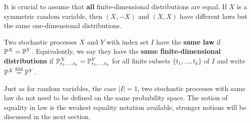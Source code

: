 It is crucial to assume that \textbf{all} finite-dimensional distributions are equal. If $X$ is a symmetric random variable, then $(X,-X)$ and $(X,X)$ have different laws but the same one-dimensional distributions.
\begin{ldef}
\begin{deff}
	Two stochastic processes $X$ and $Y$ with index set $I$ have the \textbf{same law} if $\P^X=\P^Y$. Equivalently, we say they have the \textbf{same finite-dimensional distributions} if $\P^X_{t_1,...,t_k}=\P^Y_{t_1,...,t_k}$ for all finite subsets $\{t_1,...,t_k\}$ of $I$ and write $\P^X\overset{\text{fdd}}{=}\P^Y$.
\end{deff}
\end{ldef}
Just as for random variables, the case $|I|=1$, two stochastic processes with same law do not need to be defined on the same probability space. The notion of equality in law is the weakest equality notation available, stronger notions will be discussed in the next section. \smallskip

